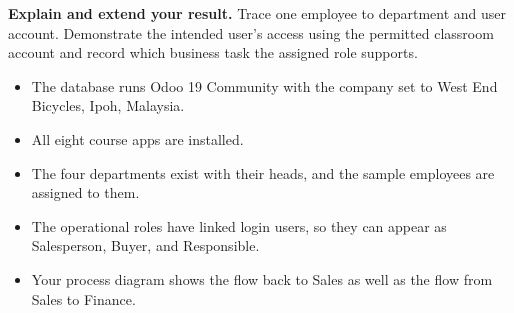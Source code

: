\begin{verification}
\textbf{Explain and extend your result.} Trace one employee to department and user account. Demonstrate the intended user's access using the permitted classroom account and record which business task the assigned role supports.


\begin{itemize}
  \item The database runs Odoo 19 Community with the company set to West End Bicycles, Ipoh, Malaysia.
  \item All eight course apps are installed.
  \item The four departments exist with their heads, and the sample employees are assigned to them.
  \item The operational roles have linked login users, so they can appear as Salesperson, Buyer, and Responsible.
  \item Your process diagram shows the flow back to Sales as well as the flow from Sales to Finance.
\end{itemize}
\end{verification}
